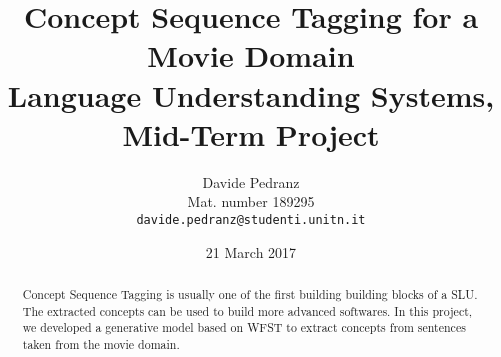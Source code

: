 \documentclass[11pt,a4paper]{article}
\title{
  Concept Sequence Tagging for a Movie Domain \\
  Language Understanding Systems, Mid-Term Project
}
\author{Davide Pedranz \\
  Mat. number 189295 \\
  {\tt davide.pedranz@studenti.unitn.it}
}
\date{21 March 2017}
\begin{document}
\maketitle

\begin{abstract}
Concept Sequence Tagging is usually one of the first building building blocks of a \ac{SLU}.
The extracted concepts can be used to build more advanced softwares.
In this project, we developed a generative model based on \ac{WFST} to extract concepts from sentences taken from the movie domain.
\end{abstract}









\end{document}
